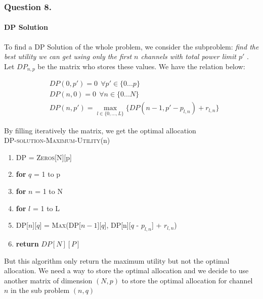 \documentclass[11pt, oneside]{report}
\begin{document}
\subsubsection{Question 8. }
\paragraph{DP Solution} To find a DP Solution of the whole problem, we consider the subproblem: \textit{find the best utility we can get using only the first $n$ channels with total power limit $p'$ }. Let $DP_{n,p}$ be the matrix who stores these values. We have the relation below: 

\begin{align*}
&DP(0,p') = 0 \ \  \forall p'\in \{0...p\} \\
&DP(n,0) = 0\ \ \forall n\in \{0...N\} \\
&DP(n,p') =  \max_{l \in \{0,...,L\}} \{ DP(n-1, p'-p_{l,n}) + r_{l,n} \}
\end{align*}

By filling iteratively the matrix, we get the optimal allocation\\

\noindent\textsc{DP-solution-Maximum-Utility}(n)
\begin{enumerate}[1\ ]
\setlength{\topsep}{0.05ex}
\setlength{\itemsep}{0.05ex}
\item DP = \textsc{Zeros}[N][p]
\item \textbf{for} $q$ = 1 to p
\item \qquad \textbf{for} $n$ = 1 to N
\item \qquad \qquad \textbf{for} $l$ = 1 to L
\item  \qquad \qquad \qquad DP[$n$][$q$] = \textsc{Max}(DP[$n-1$][$q$], DP[n][$q$ - $p_{l,n}$] + $r_{l,n}$)
\item \textbf{return} $DP[N][P]$
\end{enumerate}

But this algorithm only return the maximum utility but not the optimal allocation. We need a way to store the optimal allocation and we decide to use another matrix of dimension $(N,p)$ to store the optimal allocation for channel $n$ in the sub problem $(n,q)$
\end{document}
